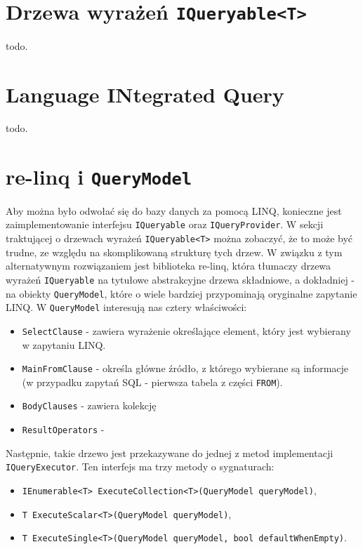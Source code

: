 \section{Drzewa wyrażeń \texttt{IQueryable<T>}}
todo.

\section{Language INtegrated Query}
todo.

\section{re-linq i \texttt{QueryModel}}
Aby można było odwołać się do bazy danych za pomocą LINQ, konieczne jest zaimplementowanie interfejsu \texttt{IQueryable} oraz \texttt{IQueryProvider}. W sekcji traktującej o drzewach wyrażeń \texttt{IQueryable<T>} można zobaczyć, że to może być trudne, ze względu na skomplikowaną strukturę tych drzew. W związku z tym alternatywnym rozwiązaniem jest biblioteka re-linq, która tłumaczy drzewa wyrażeń \texttt{IQueryable} na tytułowe abstrakcyjne drzewa składniowe, a dokładniej - na obiekty \texttt{QueryModel}, które o wiele bardziej przypominają oryginalne zapytanie LINQ. W \texttt{QueryModel} interesują nas cztery właściwości: 

\begin{itemize}
\item \texttt{SelectClause} - zawiera wyrażenie określające element, który jest wybierany w zapytaniu LINQ. 
\item \texttt{MainFromClause} - określa główne źródło, z którego wybierane są informacje (w przypadku zapytań SQL - pierwsza tabela z części \texttt{FROM}).
\item \texttt{BodyClauses} - zawiera kolekcję 
\item \texttt{ResultOperators} - 
\end{itemize}

Następnie, takie drzewo jest przekazywane do jednej z metod implementacji \texttt{IQueryExecutor}. Ten interfejs ma trzy metody o sygnaturach:

\begin{itemize}
\item \texttt{IEnumerable<T> ExecuteCollection<T>(QueryModel queryModel)},
\item \texttt{T ExecuteScalar<T>(QueryModel queryModel)},
\item \texttt{T ExecuteSingle<T>(QueryModel queryModel, bool defaultWhenEmpty)}.
\end{itemize}

